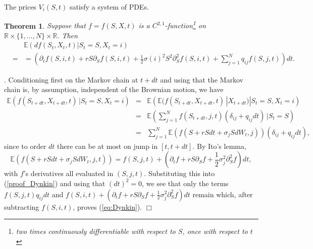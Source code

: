 \documentclass[a4paper, 11pt]{amsart}
\newtheorem{theorem}{Theorem}[section]
\newtheorem{definition and theorem}[theorem]{Definition and   
Theorem}
\begin{document}
The prices $V_i (S , t ) $ satisfy a system of PDEs.

\begin{theorem} \label{thm:Dynkin} Suppose that $f = f(S, X, t ) $ is a $C^{2, 1 } $-function\footnote{two times continuously differentiable with respect to $S $, once with respect to $t $} on $\mathbb{R } \times \{ 1 , \ldots , N \} \times \mathbb{R } . $ Then
    \begin{eqnarray} \label{eq:Dynkin}
        &&\mathbb{E } \left( df (S_t , X_t , t ) | S_t  = S , X_t = i \right) \\
        &=&= \left( \partial _t f (S , i , t ) + r S \partial _S f (S, i, t ) + \frac{1 }{2 } \sigma (i)^2 S ^2 \partial _S ^2 f (S, i , t ) + \sum _{j = 1 } ^N q_{ij }f (S , j , t ) \right) dt . \nonumber
    \end{eqnarray}
\end{theorem}

. Conditioning first on the Markov chain at $t + dt $ and using that the Markov chain is, by assumption, independent of the Brownian motion, we have
\begin{eqnarray} \nonumber
    \mathbb{E } (f(S_{t + dt } , X_{t + dt }, t ) \, | S_t = S, X_t = i ) &=& \mathbb{E } \left( \mathbb{E } (f (S_{t + dt } , X_{t + dt } , t ) \,  | X_{t + dt } ) | S_t =S , X_t = i \right) \\
    &=& \mathbb{E } \left( \sum _{j = 1 } ^N f(S_{t + dt } , j , t ) (\delta _{ij } + q_{ij } dt ) \, | S_t = S \right) \nonumber \\
    &=& \sum _{j = 1 } ^N \mathbb{E } \left( f(S + r S dt + \sigma _j S dW_t , j ) \right) (\delta _{ij } + q_{ij } dt ) , \label{proof_Dynkin}
\end{eqnarray}
since to order $dt $ there can be at most on jump in $[t, t + dt ] . $ By Ito's lemma,
$$
    \mathbb{E } \left( f(S + r S dt + \sigma _j S dW_t , j , t ) \right) = f(S, j , t ) + \left( \partial _t f + r S \partial _S f + \frac{1 }{2 } \sigma _j ^2 \partial _S ^2 f \right) dt ,
$$
with $f $'s derivatives all evaluated in $(S, j, t ) . $ Substituting this into (\ref{proof_Dynkin}) and using that $ (dt)^2 = 0 $, we see that only the terms $f(S, j , t ) q_{ij } dt $ and $f(S , i , t ) + \left( \partial _t f + r S \partial _S f + \frac{1 }{2 } \sigma _j ^2 \partial _S ^2 f \right) dt $ remain which, after subtracting $f(S , i , t ) $, proves (\ref{eq:Dynkin}). \hfill $\Box $
\medskip
\end{document}
